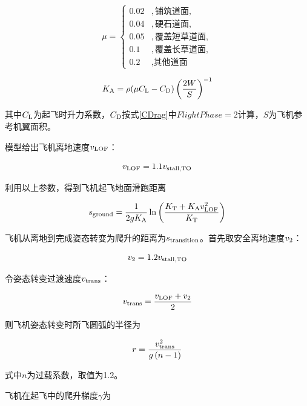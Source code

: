 \documentclass[a4paper,punct,space,heading=true,AutoFakeBold]{ctexrep}
\begin{document}
\begin{equation}\label{mu}
\mu=\left\{\begin{array}{ll}
0.02   &   , \text{铺筑道面},\\    
0.04   &   , \text{硬石道面},\\
0.05   &   , \text{覆盖短草道面},\\
0.1   &   , \text{覆盖长草道面},\\
0.2   &   , \text{其他道面}
\end{array}\right.
\end{equation}

\begin{equation}\label{KA}
K_{\rm A}=\rho(\mu C_{\rm L}-C_{\rm D})\left(\frac{2W}{S}\right)^{-1}
\end{equation}

其中$C_{\rm L}$为起飞时升力系数，$C_{\rm D}$按式\ref{CDrag}中$FlightPhase=2$计算，$S$为飞机参考机翼面积。

模型给出飞机离地速度$v_{\rm LOF}$：

\begin{equation}
v_{\rm LOF}=1.1v_{\rm stall,TO}
\end{equation}

利用以上参数，得到飞机起飞地面滑跑距离

\begin{equation}
s_{\rm ground}=\frac{1}{2gK_{\rm A}}\ln\left(\frac{K_{\rm T}+K_{\rm A}v_{\rm LOF}^2}{K_{\rm T}}\right)
\end{equation}

飞机从离地到完成姿态转变为爬升的距离为$s_{\rm transition}$。首先取安全离地速度$v_{\rm 2}$：

\begin{equation}
v_{\rm 2}=1.2v_{\rm stall,TO}
\end{equation}

令姿态转变过渡速度$v_{\rm trans}$：

\begin{equation}
v_{\rm trans}=\frac{v_{\rm LOF}+v_{\rm 2}}{2}
\end{equation}

则飞机姿态转变时所飞圆弧的半径为

\begin{equation}
r=\frac{v_{\rm trans}^2}{g\left(n-1\right)}
\end{equation}

式中$n$为过载系数，取值为1.2。

飞机在起飞中的爬升梯度$\gamma$为
\end{document}
